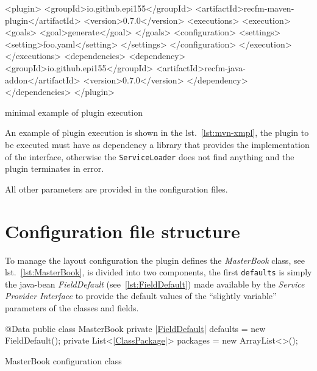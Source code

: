 \documentclass[a4paper,10pt]{report}
\newenvironment{elisting}[1][H]
  {\captionsetup{aboveskip=0pt}\begin{listing}[#1]}
  {\end{listing}%
}
\begin{document}

\begin{elisting}[!htb]
\begin{xmlcode}
<plugin>
    <groupId>io.github.epi155</groupId>
    <artifactId>recfm-maven-plugin</artifactId>
    <version>0.7.0</version>
    <executions>
        <execution>
            <goals>
                <goal>generate</goal>
            </goals>
            <configuration>
                <settings>
                    <setting>foo.yaml</setting>
                </settings>
            </configuration>
        </execution>
    </executions>
    <dependencies>
        <dependency>
            <groupId>io.github.epi155</groupId>
            <artifactId>recfm-java-addon</artifactId>
            <version>0.7.0</version>
        </dependency>
    </dependencies>
</plugin>
\end{xmlcode}
\caption{minimal example of plugin execution}
\label{lst:mvn-xmpl}
\end{elisting}
An example of plugin execution is shown in the lst.~\ref{lst:mvn-xmpl}, the 
plugin to be executed must have as dependency a library that provides the 
implementation of the interface, otherwise the \verb!ServiceLoader! does not 
find anything and the plugin terminates in error.

All other parameters are provided in the configuration files.

\section{Configuration file structure}
To manage the layout configuration the plugin defines the \textsl{MasterBook} 
class, see lst.~\ref{lst:MasterBook}, is divided into two components, the first 
\texttt{defaults} is simply the java-bean \textsl{FieldDefault} 
(see~\ref{lst:FieldDefault}) made available by the 
\textsl{Service Provider Interface} to provide the default values of the 
``slightly variable'' parameters of the classes and fields.

\begin{elisting}[!htb]
\begin{javacode}
@Data
public class MasterBook {
    private |\hyperref[lst:FieldDefault]{FieldDefault}| defaults = new FieldDefault();
    private List<|\hyperref[lst:ClassPackage]{ClassPackage}|> packages = new ArrayList<>();
}
\end{javacode}
\caption{MasterBook configuration class}
\label{lst:MasterBook}
\end{elisting}
\end{document}
